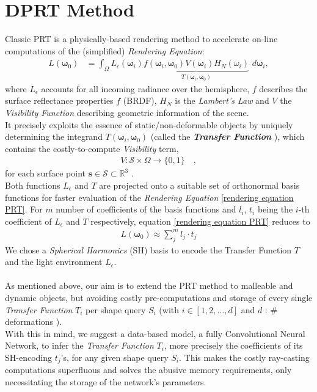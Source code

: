 \section{DPRT Method}
Classic PRT  is a physically-based rendering method to accelerate on-line computations of the (simplified) \textit{Rendering Equation}:
\begin{align}
L(\bm{\omega}_0 ) &= 
\int_{\Omega}   L_{\epsilon}(\bm{\omega}_i ) 
\underbrace{f(\bm{\omega}_i,\bm{\omega}_0) 
V(\bm{\omega}_i) H_N(\omega_i) }_{T(\bm{\omega}_i,\bm{\omega}_0) }
\,  \, d\bm{\omega}_i , 
\label{rendering equation PRT}
\end{align}
where $L_{\epsilon}$ accounts for all incoming radiance over the hemisphere, $f$  describes the surface reflectance properties $f$ (BRDF), $H_N$ is the \textit{Lambert's Law} and $V$ the \textit{Visibility Function} describing geometric information of the scene.\\
It precisely exploits the essence of static/non-deformable objects by uniquely determining the integrand $T(\bm{\omega}_i,\bm{\omega}_0)$ (called the \textbf{\textit{Transfer Function}} ), which contains the costly-to-compute  \textit{Visibility} term,
\begin{align*}
V :  \mathcal{S}  \times \Omega \rightarrow \{0,1\} \quad,
\end{align*}
for each surface point $\bm{s} \in \mathcal{S} \subset \mathbb{R}^3$ \cite{CohenBook}. 
\\
Both functions $L_{\epsilon} $ and $T$  are projected onto a suitable set of orthonormal basis functions for faster evaluation of the \textit{Rendering Equation} \ref{rendering equation PRT}. 
For $m$ number of coefficients of the basis functions and $l_i$, $t_i$ being the $i$-th coefficient of $L_{\epsilon} $ and $T$ respectively, equation \ref{rendering equation PRT} reduces to \cite{sloan2002precomputed} 
\begin{align}
L(\bm{\omega}_0 ) \approx \sum_{j}^{m} l_j \cdot t_j 
\label{Eq: Reduced Rendering Eq}
\end{align}
We chose a \textit{Spherical Harmonics} (SH) basis to encode the Transfer Function $T$ and the light environment $L_{\epsilon}$.
\\
\\
 As mentioned above, our aim is to extend the PRT method to malleable and dynamic objects, but avoiding costly pre-computations and storage of every single \textit{Transfer Function} $T_i$ per shape query $S_i$ (with $i \in [1,2,\dots, d]$ and $d$ : $\#$ deformations ). \\
With this in mind, we suggest a data-based model, a fully Convolutional Neural Network, to infer the \textit{Transfer Function} $T_i$, more precisely the coefficients of its SH-encoding $t_j$'s, for any given shape query $S_i$.
This makes the costly ray-casting computations superfluous and solves the abusive memory requirements, only necessitating the storage of the network's parameters. 
